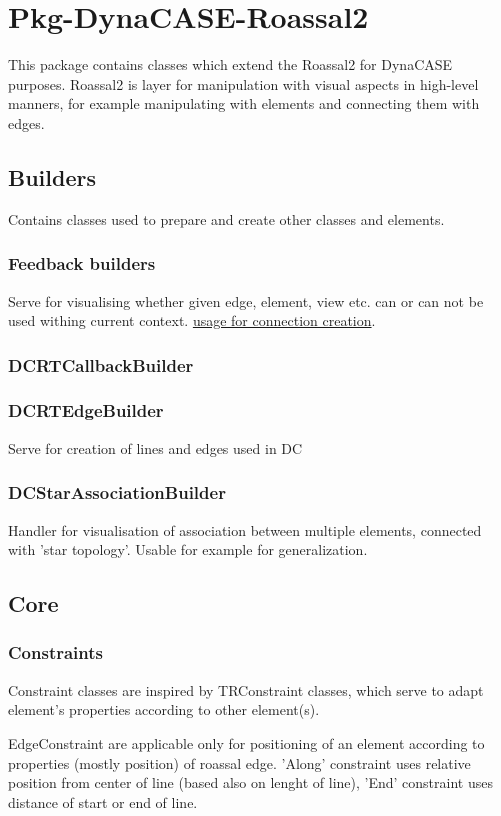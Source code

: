 \documentclass[a4paper,10pt,twoside]{book}
\begin{document}
\chapter{ Pkg-DynaCASE-Roassal2}
This package contains classes which extend the Roassal2 for DynaCASE purposes.
Roassal2 is layer for manipulation with visual aspects in high-level manners, for example manipulating with elements and connecting them with edges.
\section{ Builders}
Contains classes used to prepare and create other classes and elements.
\subsection{ Feedback builders}
Serve for visualising whether given edge, element, view etc. can or can not be used withing current context.
\href{../figures/connection%20creation%20tool%20sequence.png}{usage for connection creation}.
\subsection{ DCRTCallbackBuilder}\subsection{ DCRTEdgeBuilder}
Serve for creation of lines and edges used in DC
\subsection{ DCStarAssociationBuilder}
Handler for visualisation of association between multiple elements, connected with 'star topology'. Usable for example for generalization.
\section{ Core}\subsection{ Constraints}
Constraint classes are inspired by TRConstraint classes, which serve to adapt element's properties according to other element(s).

EdgeConstraint are applicable only for positioning of an element according to properties (mostly position) of roassal edge.
'Along' constraint uses relative position from center of line (based also on lenght of line), 'End' constraint uses distance of start or end of line.
\end{document}
